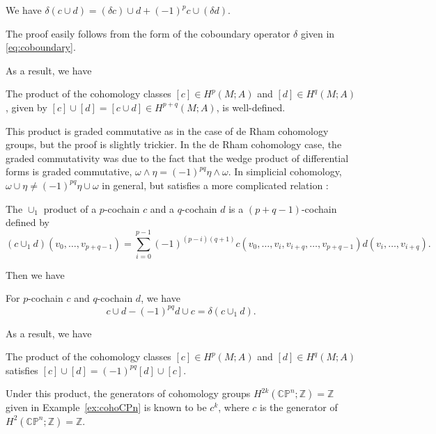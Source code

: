 \documentclass[12pt]{article}
\numberwithin{equation}{section}
\theoremstyle{remark}
\def\bZ{\mathbb{Z}}
\def\CP{\mathbb{CP}}
\begin{document}
\begin{proposition}
We have $\delta(c\cup d) = (\delta c)\cup d + (-1)^p c\cup (\delta d)$.
\end{proposition}
The proof easily follows from the  form of the coboundary operator $\delta$ given in \eqref{eq:coboundary}.

As a result, we have
\begin{proposition}
The product of the cohomology classes $[c]\in H^p(M;A)$ and $[d]\in H^q(M;A)$,
given by $[c]\cup [d] = [c\cup d]\in H^{p+q}(M;A)$,
is well-defined.
\end{proposition}

This product is graded commutative as in the case of de Rham cohomology groups,
but the proof is slightly trickier.
In the de Rham cohomology case,
the graded commutativity was due to the fact that the wedge product of differential forms is graded commutative,
$\omega\wedge\eta=(-1)^{pq}\eta\wedge\omega$.
In simplicial cohomology,
$\omega \cup \eta \neq (-1)^{pq} \eta \cup \omega$ in general,
but satisfies a more complicated relation \cite{SteenrodHigherProduct}:
\begin{definition}
The $\cup_1$ product of a $p$-cochain $c$ and a $q$-cochain $d$ is 
a $(p+q-1)$-cochain
defined by \begin{equation}
(c\cup_1 d)(v_0,\ldots,v_{p+q-1}) = \sum_{i=0}^{p-1} (-1)^{(p-i)(q+1)}c(v_0,\ldots,v_i,v_{i+q},\ldots,v_{p+q-1}) d(v_i,\ldots,v_{i+q}).
\end{equation}
\end{definition}
Then we have 
\begin{proposition}
For $p$-cochain $c$ and $q$-cochain $d$, we have \begin{equation}
c\cup d-(-1)^{pq}d\cup c = \delta(c\cup_1 d) .
\end{equation}
\end{proposition}
As a result, we have 
\begin{corollary}
The product of the cohomology classes $[c]\in H^p(M;A)$ and $[d]\in H^q(M;A)$
satisfies $[c]\cup [d] = (-1)^{pq}[d]\cup [c]$.
\end{corollary}

Under this product, the generators of cohomology groups $H^{2k}(\CP^n;\bZ)=\bZ$
given in Example~\ref{ex:cohoCPn}
is known to be $c^k$, where $c$ is the generator of $H^2(\CP^n;\bZ)=\bZ$.
\end{document}

